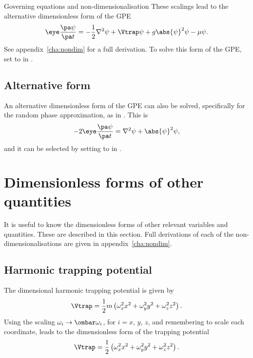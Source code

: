 \begin{chapter}{\label{cha:equations}Governing equations and
  non-dimensionalisation}
  These scalings lead to the alternative dimensionless form of the GPE
  \begin{equation*}
    \eye \frac{\pa \psi}{\pa t} = -\frac{1}{2}\nabla^{2}\psi + \Vtrap\psi +
    g\abs{\psi}^{2}\psi - \mu\psi.
  \end{equation*}
  See appendix~\ref{cha:nondim} for a full derivation.  To solve this form of
  the GPE, set  to  in .

  \subsection{Alternative form}
  An alternative dimensionless form of the GPE can also be solved, specifically
  for the random phase approximation, as in \citet{BS02}.  This is
  \begin{equation*}
    -2\eye\frac{\pa \psi}{\pa t} = \nabla^{2}\psi + \abs{\psi}^{2}\psi,
  \end{equation*}
  and it can be selected by setting  to  in
  .

  \section{Dimensionless forms of other quantities}
  It is useful to know the dimensionless forms of other relevant variables and
  quantities.  These are described in this section.  Full derivations of each
  of the non-dimensionalisations are given in appendix~\ref{cha:nondim}.

  \subsection{Harmonic trapping potential}
  The dimensional harmonic trapping potential is given by
  \begin{equation}
    \Vtrap = \frac{1}{2} m \left( \omega_{x}^{2} x^{2} + \omega_{y}^{2} y^{2} +
    \omega_{z}^{2} z^{2} \right).
    \label{eqn:trap}
  \end{equation}
  Using the scaling $\omega_{i} \to \ombar \omega_{i}$, for $i=x$, $y$, $z$,
  and remembering to scale each coordinate, leads to the dimensionless form of
  the trapping potential
  \begin{equation*}
    \Vtrap = \frac{1}{2} \left( \omega_{x}^{2} x^{2} + \omega_{y}^{2} y^{2} +
    \omega_{z}^{2} z^{2} \right).
  \end{equation*}


\end{chapter}
